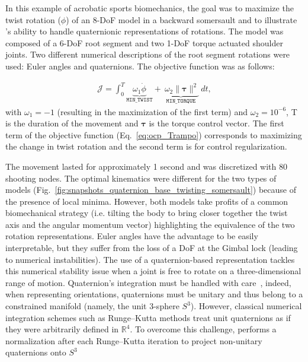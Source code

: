 In this example of acrobatic sports biomechanics, the goal was to maximize the twist rotation ($\phi$) of an 8-DoF model in a backward somersault and to illustrate \bioptim 's ability to handle quaternionic representations of rotations.
The model was composed of a 6-DoF root segment and two 1-DoF torque actuated shoulder joints.
Two different numerical descriptions of the root segment rotations were used: Euler angles and quaternions.
The objective function was as follows:

\begin{eqnarray}\label{eq:ocp_Trampo}
\mathcal{J} =  \int_0^T\underbrace{\omega_1 \dot{\phi}}_{\mathtt{MIN\_TWIST}}  + \underbrace{~\omega_2  \|\boldsymbol{\tau}\|^2}_{\mathtt{MIN\_ TORQUE}}~dt,
\end{eqnarray} 
with $\omega_1 = -1$ (resulting in the maximization of the first term) and $\omega_2 = 10^{-6}$, T is the duration of the movement and $\boldsymbol{\tau}$ is the torque control vector.
The first term of the objective function (Eq.~\ref{eq:ocp_Trampo}) corresponds to maximizing the change in twist rotation and the second term is for control regularization.


The movement lasted for approximately 1 second and was discretized with 80 shooting nodes.
The optimal kinematics were different for the two types of models (Fig.~\ref{fig:snapshots_quaternion_base_twisting_somersault}) because of the presence of local minima.
However, both models take profits of a common biomechanical strategy (i.e. tilting the body to bring closer together the twist axis and the angular momentum vector) highlighting the equivalence of the two rotation representations.
Euler angles have the advantage to be easily interpretable, but they suffer from the loss of a DoF at the Gimbal lock (leading to numerical instabilities).
The use of a quaternion-based representation tackles this numerical stability issue when a joint is free to rotate on a three-dimensional range of motion.
Quaternion's integration must be handled with care~\cite{bailly2020optimal}, indeed, when representing orientations, quaternions must be unitary and thus belong to a constrained manifold (namely, the unit 3-sphere $S^3$). 
However, classical numerical integration schemes such as Runge–Kutta methods treat unit quaternions as if they were arbitrarily defined in $\mathbb{R}^4$.
To overcome this challenge, \bioptim performs a normalization after each Runge–Kutta iteration to project non-unitary quaternions onto $S^3$



